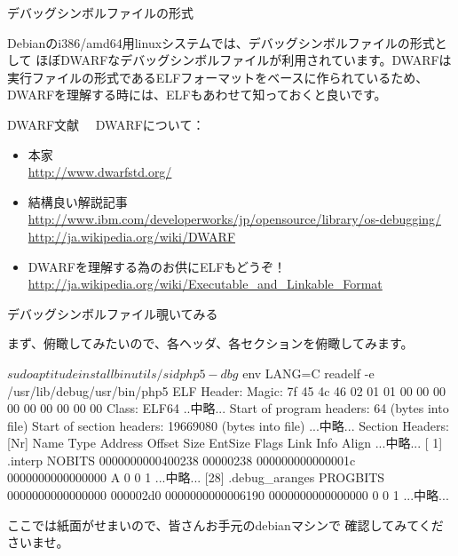\begin{frame}{デバッグシンボルファイルの形式}

 Debianのi386/amd64用linuxシステムでは、デバッグシンボルファイルの形式として
ほぼDWARFなデバッグシンボルファイルが利用されています。DWARFは
実行ファイルの形式であるELFフォーマットをベースに作られているため、
DWARFを理解する時には、ELFもあわせて知っておくと良いです。

\end{frame}

\begin{frame}{DWARF文献}
　DWARFについて：\\
\begin{itemize}
\item 本家 \\
\url{http://www.dwarfstd.org/}
\item 結構良い解説記事 \\
\url{http://www.ibm.com/developerworks/jp/opensource/library/os-debugging/}\\
\url{http://ja.wikipedia.org/wiki/DWARF}\\
\item DWARFを理解する為のお供にELFもどうぞ！\\
\url{http://ja.wikipedia.org/wiki/Executable_and_Linkable_Format}
\end{itemize}
\end{frame}


\begin{frame}[containsverbatim]{デバッグシンボルファイル覗いてみる}

まず、俯瞰してみたいので、各ヘッダ、各セクションを俯瞰してみます。
\begin{commandlinesmall}
$ sudo aptitude install binutils/sid php5-dbg
$ env LANG=C readelf -e /usr/lib/debug/usr/bin/php5
ELF Header:
  Magic:   7f 45 4c 46 02 01 01 00 00 00 00 00 00 00 00 00 
  Class:                             ELF64
..中略...
  Start of program headers:          64 (bytes into file)
  Start of section headers:          19669080 (bytes into file)
...中略...
Section Headers:
  [Nr] Name              Type             Address           Offset
       Size              EntSize          Flags  Link  Info  Align
...中略...
  [ 1] .interp           NOBITS           0000000000400238  00000238
       000000000000001c  0000000000000000   A       0     0     1
...中略...
  [28] .debug_aranges    PROGBITS         0000000000000000  000002d0
       0000000000006190  0000000000000000           0     0     1
...中略...  
\end{commandlinesmall} 
ここでは紙面がせまいので、皆さんお手元のdebianマシンで
確認してみてくださいませ。
\end{frame}

